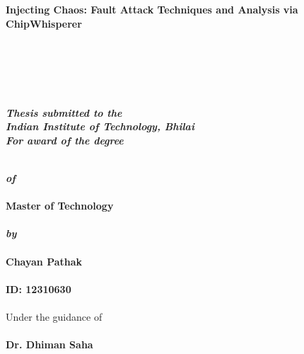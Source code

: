 \thispagestyle{empty}
\vspace{-15mm}
\begin{center}
	\begin{Spacing}{1.5}
    \textbf{\Large Injecting Chaos: Fault Attack Techniques and Analysis via ChipWhisperer} \\
   	\end{Spacing}
	\hspace{0pt plus 1filll} \\
	\hspace{0pt plus 1filll} \\
	\hspace{0pt plus 1filll} \\
	\hspace{0pt plus 1filll} \\
	\begin{Spacing}{1.4}
    \textbf{\emph{ Thesis submitted to the}} \\ 
   	\textbf{\emph{ Indian Institute of Technology, Bhilai}}\\
   	\textbf{\emph{ For award of the degree}}\\
   	\end{Spacing}
	\hspace{0pt plus 1filll} \\
    \textbf{ \emph{of}}\\
	\hspace{0pt plus 1filll} \\
    \textbf{ Master of Technology}\\
	\hspace{0pt plus 1filll} \\
    \textbf{\emph{ by}}\\
	\hspace{0pt plus 1filll} \\
    \textbf{ Chayan Pathak}\\
	\hspace{0pt plus 1filll} \\
	\textbf{ ID: 12310630}\\
	\hspace{0pt plus 1filll} \\
    { Under the guidance of}\\
	\hspace{0pt plus 1filll} \\
    \textbf{ Dr. Dhiman Saha} 
    \begin{figure}[h]
    \centering

\end{figure}
\end{center}
